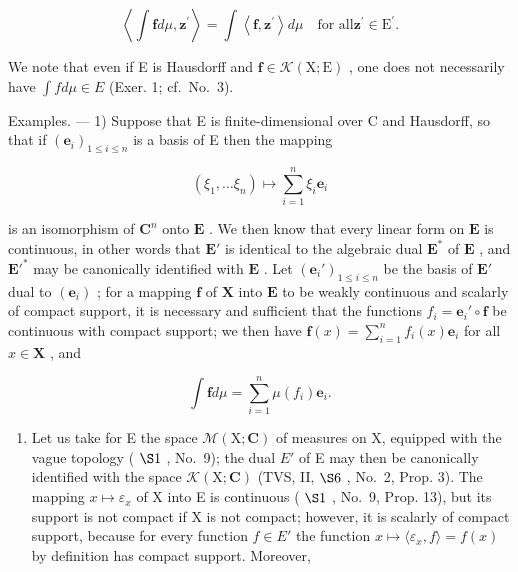 \[
\left\langle \int \mathbf {f} d \mu , \mathbf {z} ^ {\prime} \right\rangle = \int \left\langle \mathbf {f}, \mathbf {z} ^ {\prime} \right\rangle d \mu \quad \text {for all} \mathbf {z} ^ {\prime} \in \mathrm{E} ^ {\prime}.\tag{1}
\]

We note that even if E is Hausdorff and \(\mathbf{f} \in \mathcal{K}(\mathrm{X};\mathrm{E})\) , one does not necessarily have \(\int f d\mu \in E\) (Exer. 1; cf.~No.~3).

Examples. --- 1) Suppose that E is finite-dimensional over C and Hausdorff, so that if \((\mathbf{e}_{i})_{1\leqslant i\leqslant n}\) is a basis of E then the mapping

\[
\left(\xi_ {1}, \dots \xi_ {n}\right) \mapsto \sum_ {i = 1} ^ {n} \xi_ {i} \mathbf {e} _ {i}
\]

is an isomorphism of \(\mathbf{C}^n\) onto \(\mathbf{E}\) . We then know that every linear form on \(\mathbf{E}\) is continuous, in other words that \(\mathbf{E}'\) is identical to the algebraic dual \(\mathbf{E}^*\) of \(\mathbf{E}\) , and \(\mathbf{E}'^*\) may be canonically identified with \(\mathbf{E}\) . Let \((\mathbf{e}_i')_{1 \leqslant i \leqslant n}\) be the basis of \(\mathbf{E}'\) dual to \((\mathbf{e}_i)\) ; for a mapping \(\mathbf{f}\) of \(\mathbf{X}\) into \(\mathbf{E}\) to be weakly continuous and scalarly of compact support, it is necessary and sufficient that the functions \(f_i = \mathbf{e}_i' \circ \mathbf{f}\) be continuous with compact support; we then have \(\mathbf{f}(x) = \sum_{i=1}^{n} f_i(x) \mathbf{e}_i\) for all \(x \in \mathbf{X}\) , and

\[
\int \mathbf {f} d \mu = \sum_ {i = 1} ^ {n} \mu (f _ {i}) \mathbf {e} _ {i}.
\]

\begin{enumerate}
\def\labelenumi{\arabic{enumi})}
\setcounter{enumi}{1}
\tightlist
\item
  Let us take for E the space \(\mathcal{M}(\mathrm{X};\mathbf{C})\) of measures on X, equipped with the vague topology ( \(\S1\) , No.~9); the dual \(E'\) of E may then be canonically identified with the space \(\mathcal{K}(\mathrm{X};\mathbf{C})\) (TVS, II, \(\S6\) , No.~2, Prop. 3). The mapping \(x \mapsto \varepsilon_{x}\) of X into E is continuous ( \(\S1\) , No.~9, Prop. 13), but its support is not compact if X is not compact; however, it is scalarly of compact support, because for every function \(f \in E'\) the function \(x \mapsto \langle \varepsilon_x, f \rangle = f(x)\) by definition has compact support. Moreover,
\end{enumerate}

